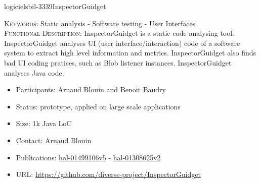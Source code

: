 \documentclass{ra2018}
\begin{document}
\begin{module}{logiciels}{bil-3339}{InspectorGuidget}

   \textsc{Keywords:} Static analysis - Software testing - User Interfaces \\ 


   

 \textsc{Functional Description:}  InspectorGuidget is a static code analysing tool. InspectorGuidget analyses UI (user interface/interaction) code  of a software system to extract high level information and metrics. InspectorGuidget also finds bad UI coding pratices, such as Blob listener instances. InspectorGuidget analyses Java code.\\

   \begin{itemize}
      \item Participants: Arnaud Blouin and Benoit Baudry
      \item Status: prototype, applied on large scale applications
      \item Size: 1k Java LoC
      \item Contact: Arnaud Blouin
      \item Publications: \href{https://hal.inria.fr/hal-01499106v5}{hal-01499106v5} - 
 \href{https://hal.inria.fr/hal-01308625v2}{hal-01308625v2}
      \item URL: \url{https://github.com/diverse-project/InspectorGuidget}
   \end{itemize}

 \end{module}
\end{document}
